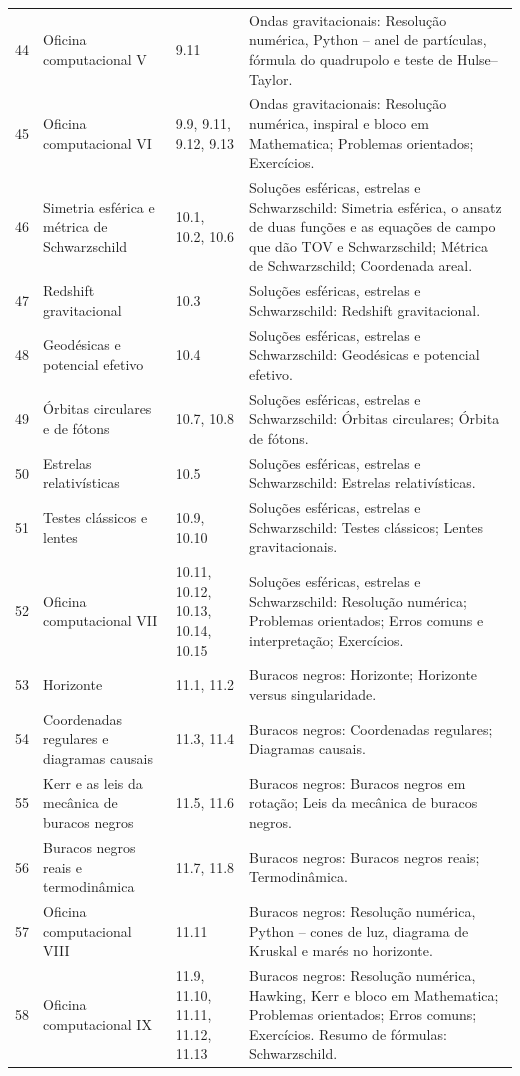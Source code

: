 \documentclass[12pt,a4paper,oneside]{book}
\theoremstyle{rgplain}
\theoremstyle{rgremark}
\begin{document}
\begin{longtable}{cp{3.3cm}p{2.3cm}p{6.1cm}}
44 & Oficina computacional V & 9.11 & Ondas gravitacionais: Resolução numérica, Python -- anel de partículas, fórmula do quadrupolo e teste de Hulse--Taylor. \\
45 & Oficina computacional VI & 9.9, 9.11, 9.12, 9.13 & Ondas gravitacionais: Resolução numérica, inspiral e bloco em Mathematica; Problemas orientados; Exercícios. \\
46 & Simetria esférica e métrica de Schwarzschild & 10.1, 10.2, 10.6 & Soluções esféricas, estrelas e Schwarzschild: Simetria esférica, o ansatz de duas funções e as equações de campo que dão TOV e Schwarzschild; Métrica de Schwarzschild; Coordenada areal. \\
47 & Redshift gravitacional & 10.3 & Soluções esféricas, estrelas e Schwarzschild: Redshift gravitacional. \\
48 & Geodésicas e potencial efetivo & 10.4 & Soluções esféricas, estrelas e Schwarzschild: Geodésicas e potencial efetivo. \\
49 & Órbitas circulares e de fótons & 10.7, 10.8 & Soluções esféricas, estrelas e Schwarzschild: Órbitas circulares; Órbita de fótons. \\
50 & Estrelas relativísticas & 10.5 & Soluções esféricas, estrelas e Schwarzschild: Estrelas relativísticas. \\
51 & Testes clássicos e lentes & 10.9, 10.10 & Soluções esféricas, estrelas e Schwarzschild: Testes clássicos; Lentes gravitacionais. \\
52 & Oficina computacional VII & 10.11, 10.12, 10.13, 10.14, 10.15 & Soluções esféricas, estrelas e Schwarzschild: Resolução numérica; Problemas orientados; Erros comuns e interpretação; Exercícios. \\
53 & Horizonte & 11.1, 11.2 & Buracos negros: Horizonte; Horizonte versus singularidade. \\
54 & Coordenadas regulares e diagramas causais & 11.3, 11.4 & Buracos negros: Coordenadas regulares; Diagramas causais. \\
55 & Kerr e as leis da mecânica de buracos negros & 11.5, 11.6 & Buracos negros: Buracos negros em rotação; Leis da mecânica de buracos negros. \\
56 & Buracos negros reais e termodinâmica & 11.7, 11.8 & Buracos negros: Buracos negros reais; Termodinâmica. \\
57 & Oficina computacional VIII & 11.11 & Buracos negros: Resolução numérica, Python -- cones de luz, diagrama de Kruskal e marés no horizonte. \\
58 & Oficina computacional IX & 11.9, 11.10, 11.11, 11.12, 11.13 & Buracos negros: Resolução numérica, Hawking, Kerr e bloco em Mathematica; Problemas orientados; Erros comuns; Exercícios. Resumo de fórmulas: Schwarzschild. \\

\end{longtable}
\end{document}
